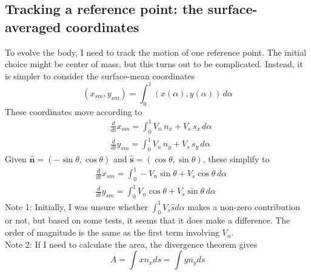 \documentclass[11pt]{article}
\newcommand{\td}[2] { \frac{d #1} { d #2 } }
\newcommand{\bvec}[1]{\ensuremath{\boldsymbol{#1}}}
\newcommand{\nhat}{\hat{\bvec{n}}}
\newcommand{\shat}{\hat{\bvec{s}}}
\begin{document}
\subsection{Tracking a reference point: the surface-averaged coordinates}
To evolve the body, I need to track the motion of one reference point. The initial choice might be center of mass, but this turns out to be complicated. Instead, it is simpler to consider the surface-mean coordinates
\begin{equation}
(x_{sm}, y_{sm}) = \int_0^1 (x(\alpha), y(\alpha)) \, d\alpha
\end{equation}
These coordinates move according to
\begin{align}
& \td{}{t} x_{sm} = \int_0^1 V_n \, n_x + V_s \, s_x \, d\alpha \\
& \td{}{t} y_{sm} = \int_0^1 V_n \, n_y + V_s \, s_y \, d\alpha
\end{align}
Given $\nhat = (-\sin \theta, \cos \theta)$ and $\shat = (\cos \theta, \sin \theta)$, these simplify to
\begin{align}
& \td{}{t} x_{sm} = \int_0^1 -V_n \sin \theta + V_s \cos \theta \, d\alpha \\
& \td{}{t} y_{sm} = \int_0^1 V_n \cos \theta + V_s \sin \theta \, d\alpha
\end{align}
Note 1: Initially, I was unsure whether $\int_0^1 V_s \hat{s} d\alpha$ makes a non-zero contribution or not, but based on some tests, it seems that it does make a difference. The order of magnitude is the same as the first term involving $V_n$. \\
Note 2: If I need to calculate the area, the divergence theorem gives
\begin{equation}
A = \int x n_x ds = \int y n_y ds
\end{equation}
\end{document}
